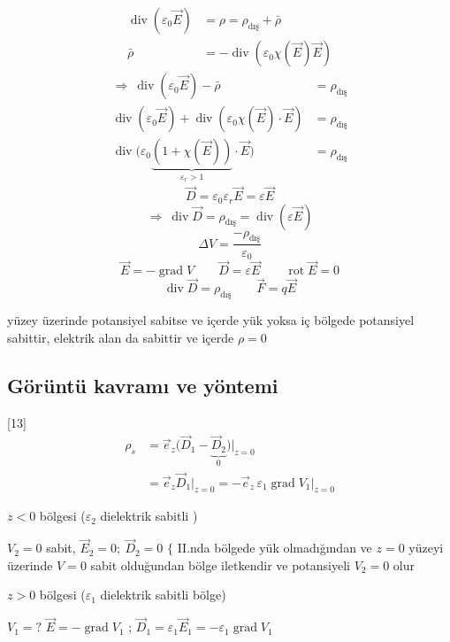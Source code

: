 \documentclass[11pt,a4paper]{article}
\begin{document}
\begin{align*}
\operatorname{div}(\varepsilon_0\vec E)&=\rho=\rho_{\text{dış}}+\bar\rho\\
\bar\rho&=-\operatorname{div}\left(\varepsilon_0\chi(\vec E)\vec E\right)
\end{align*}
\begin{align*}
\Rightarrow\ \operatorname{div}(\varepsilon_0\vec E)-\bar\rho&=\rho_{\text{dış}}\\
\operatorname{div}(\varepsilon_0\vec E)+\operatorname{div}(\varepsilon_0\chi(\vec E)\cdot\vec E)&=\rho_{\text{dış}}\\
\operatorname{div}\Big(\varepsilon_0\underbrace{(1+\chi(\vec E))}_{\varepsilon_r>1}\cdot\vec E\Big)&=\rho_{\text{dış}}
\end{align*}
\[
\vec D=\varepsilon_0\varepsilon_r\vec E=\varepsilon\vec E
\]
\[
\Rightarrow\ \operatorname{div}\vec D=\rho_{\text{dış}}=\operatorname{div}(\varepsilon\vec E)
\]
\[
\Delta V=\frac{-\rho_{\text{dış}}}{\varepsilon_0}
\]
\[
\vec E=-\operatorname{grad}V\qquad\vec D=\varepsilon\vec E\qquad\operatorname{rot}\vec E=0
\]
\[
\operatorname{div}\vec D=\rho_{\text{dış}}\qquad\vec F=q\vec E
\]

yüzey üzerinde potansiyel sabitse ve içerde yük yoksa iç bölgede potansiyel sabittir, elektrik alan da sabittir ve içerde $\rho=0$

\subsection{Görüntü kavramı ve yöntemi}
[13]
\begin{align*}
\rho_s&=\vec e_z\Big(\vec D_1-\underbrace{\vec D_2}_{0}\Big)\Big|_{z=0}\\
&=\vec e_z\vec D_1\Big|_{z=0}=-\vec e_z\,\varepsilon_1\operatorname{grad}V_1\Big|_{z=0}
\end{align*}

$z<0$ bölgesi ($\varepsilon_2$ dielektrik sabitli )

$V_2=0$ sabit, \quad $\vec E_2=0;\ \vec D_2=0$ \quad $\Big\{$ II.nda bölgede yük olmadığından ve $z=0$ yüzeyi üzerinde $V=0$ sabit olduğundan bölge iletkendir ve potansiyeli $V_2=0$ olur

$z>0$ bölgesi ($\varepsilon_1$ dielektrik sabitli bölge)

$V_1=?$ \quad $\vec E=-\operatorname{grad}V_1$ ; $\vec D_1=\varepsilon_1\vec E_1=-\varepsilon_1\operatorname{grad}V_1$
\end{document}

